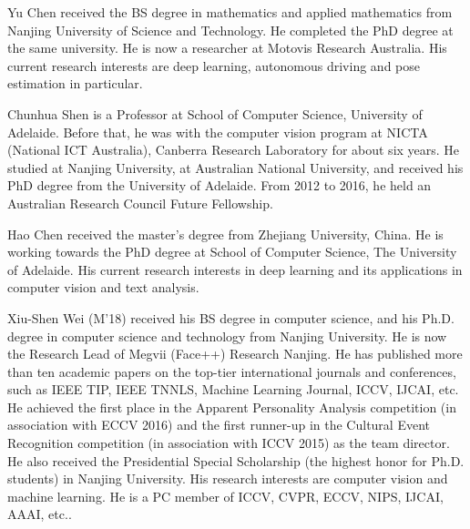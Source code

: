 






\begin{IEEEbiography}{Yu Chen}
received the BS degree in mathematics and applied mathematics from Nanjing University of Science and Technology.
He completed  the PhD degree at the same university.
He is now  a researcher at  Motovis Research Australia.
His current research interests are deep learning, autonomous driving and pose estimation in particular. \end{IEEEbiography}





\begin{IEEEbiography}
{Chunhua Shen}
is a Professor at School of Computer Science, University of Adelaide.
Before that, he was with the computer vision program at NICTA (National ICT Australia), Canberra Research Laboratory for about six years.
He studied at Nanjing University, at Australian National University, and received his PhD degree from the University of Adelaide.
    From 2012 to 2016, he held an Australian Research Council Future Fellowship.
 \end{IEEEbiography}





\begin{IEEEbiography}
{Hao Chen} received the master's degree from Zhejiang University, China. He is working towards the PhD degree at School of Computer Science,  The University of Adelaide. His current research interests in deep learning and
 its applications in computer vision and text analysis.
 \end{IEEEbiography}

\begin{IEEEbiography}{Xiu-Shen Wei} (M'18) received his BS degree in computer science, and his Ph.D. degree in computer science and technology from Nanjing University. He is now the Research Lead of Megvii (Face++) Research Nanjing. He has published more than ten academic papers on the top-tier international journals and conferences, such as IEEE TIP, IEEE TNNLS, Machine Learning Journal, ICCV, IJCAI, etc. He achieved the first place in the Apparent Personality Analysis competition (in association with ECCV 2016) and the first runner-up in the Cultural Event Recognition competition (in association with ICCV 2015) as the team director. He also received the Presidential Special Scholarship (the highest honor for Ph.D. students) in Nanjing University. His research interests are computer vision and machine learning. He is a PC member of ICCV, CVPR, ECCV, NIPS, IJCAI, AAAI, etc..\end{IEEEbiography}


